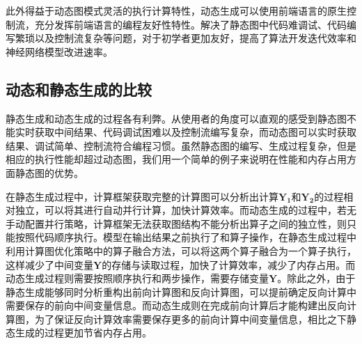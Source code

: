 \documentclass[letterpaper,10pt,english]{sphinxmanual}
\begin{document}
\sphinxAtStartPar
此外得益于动态图模式灵活的执行计算特性，动态生成可以使用前端语言的原生控制流，充分发挥前端语言的编程友好性特性。解决了静态图中代码难调试、代码编写繁琐以及控制流复杂等问题，对于初学者更加友好，提高了算法开发迭代效率和神经网络模型改进速率。


\subsection{动态和静态生成的比较}
\label{\detokenize{chapter_computational_graph/generation_of_computational_graph:id4}}
\sphinxAtStartPar
静态生成和动态生成的过程各有利弊。从使用者的角度可以直观的感受到静态图不能实时获取中间结果、代码调试困难以及控制流编写复杂，而动态图可以实时获取结果、调试简单、控制流符合编程习惯。虽然静态图的编写、生成过程复杂，但是相应的执行性能却超过动态图，我们用一个简单的例子来说明在性能和内存占用方面静态图的优势。

\begin{sphinxVerbatim}[commandchars=\\\{\}]
  
       
       
        
      
     
\end{sphinxVerbatim}

\sphinxAtStartPar
在静态生成过程中，计算框架获取完整的计算图可以分析出计算\(\boldsymbol{Y_1}\)和\(\boldsymbol{Y_2}\)的过程相对独立，可以将其进行自动并行计算，加快计算效率。而动态生成的过程中，若无手动配置并行策略，计算框架无法获取图结构不能分析出算子之间的独立性，则只能按照代码顺序执行。模型在输出结果之前执行了和算子操作，在静态生成过程中利用计算图优化策略中的算子融合方法，可以将这两个算子融合为一个算子执行，这样减少了中间变量\(\boldsymbol{Y}\)的存储与读取过程，加快了计算效率，减少了内存占用。而动态生成过程则需要按照顺序执行和两步操作，需要存储变量\(\boldsymbol{Y}\)。除此之外，由于静态生成能够同时分析重构出前向计算图和反向计算图，可以提前确定反向计算中需要保存的前向中间变量信息。而动态生成则在完成前向计算后才能构建出反向计算图，为了保证反向计算效率需要保存更多的前向计算中间变量信息，相比之下静态生成的过程更加节省内存占用。
\end{document}
